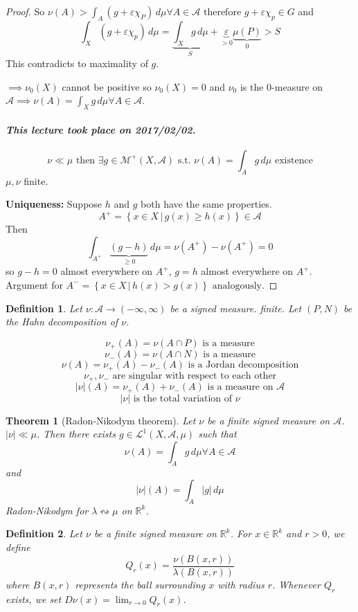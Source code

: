 \documentclass{article}
\newtheorem{theorem}{Theorem}  \numberwithin{theorem}{section}
\newtheorem{definition}{Definition}  \numberwithin{definition}{section}
\newcommand{\setdef}[2]{\left\{\left.#1\,\right|\,#2\right\}}
\newcommand{\card}[1]{\left|#1\right|}
\newcommand{\dateref}[1]{\paragraph{\textit{This lecture took place on #1.}}}
\begin{document}
\begin{proof}
  So $\nu(A) > \int_A (g + \varepsilon \chi_P) \, d\mu \forall A \in \mathcal A$
  therefore $g + \varepsilon \chi_p \in G$ and
  \[ \int_X (g + \varepsilon \chi_p) \, d\mu = \underbrace{\int_X g \, d\mu}_{S} + \underbrace{\varepsilon}_{>0} \underbrace{\mu(P)}_{0} > S \]
  This contradicts to maximality of $g$.

  $\implies \nu_0(X)$ cannot be positive so $\nu_0(X) = 0$ and $\nu_0$ is the $0$-measure on $\mathcal A \implies \nu(A) = \int_X g \, d\mu \forall A \in \mathcal A$.

  \dateref{2017/02/02}

  \[ \nu \ll \mu \text{ then } \exists g \in \mathcal M^+(X, \mathcal A) \text{ s.t. } \nu(A) = \int_A g \, d\mu \text{ existence} \]
  $\mu, \nu$ finite.

  \textbf{Uniqueness:} Suppose $h$ and $g$ both have the same properties.
  \[ A^+ = \setdef{x \in X}{g(x) \geq h(x)} \in \mathcal A \]
  Then
  \[ \int_{A^+} \underbrace{(g - h)}_{\geq 0} \, d\mu = \nu(A^+) - \nu(A^+) = 0 \]
  so $g-h = 0$ almost everywhere on $A^+$, $g = h$ almost everywhere on $A^+$.
  Argument for $A^- = \setdef{x \in X}{h(x) > g(x)} \text{ analogously}$.
\end{proof}

\begin{definition}
  Let $\nu: \mathcal A \to (-\infty, \infty)$ be a signed measure.
  finite. Let $(P, N)$ be the Hahn decomposition of $\nu$.

  \[ \nu_+(A) = \nu(A \cap P) \text{ is a measure} \]
  \[ \nu_-(A) = \nu(A \cap N) \text{ is a measure} \]
  \[ \nu(A) = \nu_+(A) - \nu_-(A) \text{ is a Jordan decomposition} \]
  \[ \nu_+, \nu_- \text{ are singular with respect to each other} \]
  \[ \card{\nu}(A) = \nu_+(A) + \nu_-(A) \text{ is a measure on } \mathcal A \]
  \[ \card{\nu} \text{ is the total variation of } \nu \]
\end{definition}

\begin{theorem}[Radon-Nikodym theorem]
  Let $\nu$ be a finite signed measure on $\mathcal A$. $\card{\nu} \ll \mu$.
  Then there exists $g \in \mathcal L^1(X, \mathcal A, \mu)$ such that
  \[ \nu(A) = \int_A g \, d\mu \forall A \in \mathcal A \]
  and
  \[ \card{\nu}(A) = \int_A \card{g} \, d\mu \]
  Radon-Nikodym for $\lambda \leftrightsquigarrow \mu$ on $\mathbb R^k$.
\end{theorem}

\begin{definition}
  Let $\nu$ be a finite signed measure on $\mathbb R^k$. For $x \in \mathbb R^k$ and $r > 0$,
  we define
  \[ Q_r(x) = \frac{\nu(B(x, r))}{\lambda(B(x, r))} \]
  where $B(x, r)$ represents the ball surrounding $x$ with radius $r$.
  Whenever $Q_r$ exists, we set $D\nu(x) = \lim_{r\to0} Q_r(x)$.
\end{definition}
\end{document}
